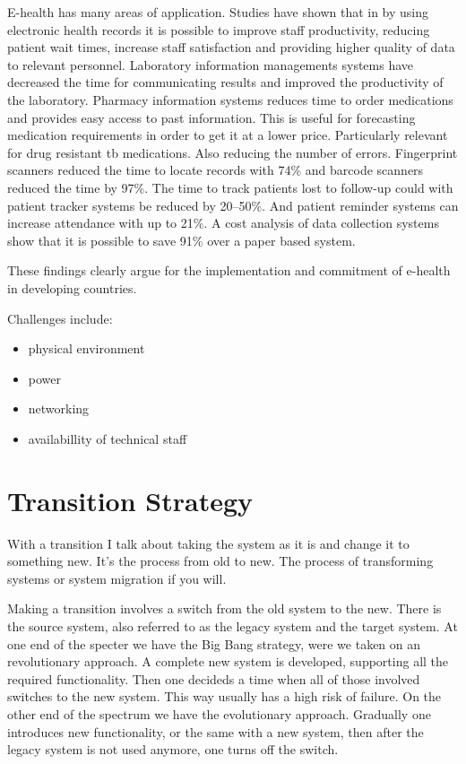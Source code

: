 E-health has many areas of application. Studies have shown that in by using electronic health records it is possible to improve staff productivity, reducing patient wait times, increase staff satisfaction and providing higher quality of data to relevant personnel. Laboratory information managements systems have decreased the time for communicating results and improved the productivity of the laboratory. Pharmacy information systems reduces time to order medications and provides easy access to past information. This is useful for forecasting medication requirements in order to get it at a lower price. Particularly relevant for drug resistant \gls{tb} medications. Also reducing the number of errors. Fingerprint scanners reduced the time to locate records with 74\% and barcode scanners reduced the time by 97\%. The time to track patients lost to follow-up could with patient tracker systems be reduced by 20--50\%. And patient reminder systems can increase attendance with up to 21\%. A cost analysis of data collection systems show that it is possible to save 91\% over a paper based system. 

These findings clearly argue for the implementation and commitment of e-health in developing countries. 

Challenges include:
\begin{itemize}
\item physical environment
\item power
\item networking
\item availabillity of technical staff
\end{itemize}

\cite{ehealth:blaya}

\section{Transition Strategy}
With a transition I talk about taking the system as it is and change it to something new. 
It's the process from old to new. The process of transforming systems or system migration if you will.

Making a transition involves a switch from the old system to the new. There
is the source system, also referred to as the legacy system and the target
system. At one end of the specter we have the Big Bang strategy, were we
taken on an revolutionary approach. A complete new system is developed,
supporting all the required functionality. Then one decideds a time when all
of those involved switches to the new system. This way usually has a high
risk of failure. On the other end of the spectrum we have the evolutionary
approach. Gradually one introduces new functionality, or the same with a
new system, then after the legacy system is not used anymore, one turns off
the switch.

